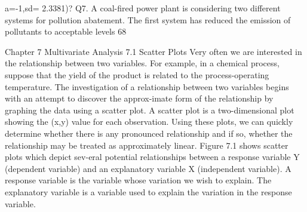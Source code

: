 a=-1,sd= 2.3381)? 
Q7. A coal-fired power plant is considering two different systems for pollution abatement. The first system has reduced the emission of pollutants to acceptable levels 68%


Chapter 7 Multivariate Analysis 7.1 Scatter Plots 
Very often we are interested in the relationship between two variables. For example, in a chemical process, suppose that the yield of the product is related to the process-operating temperature. The investigation of a relationship between two variables begins with an attempt to discover the approx-imate form of the relationship by graphing the data using a scatter plot. 
A scatter plot is a two-dimensional plot showing the (x,y) value for each observation. Using these plots, we can quickly determine whether there is any pronounced relationship and if so, whether the relationship may be treated as approximately linear. Figure 7.1 shows scatter plots which depict sev-eral potential relationships between a response variable Y (dependent variable) and an explanatory variable X (independent variable). A response variable is the variable whose variation we wish to explain. The explanatory variable is a variable used to explain the variation in the response variable. 




